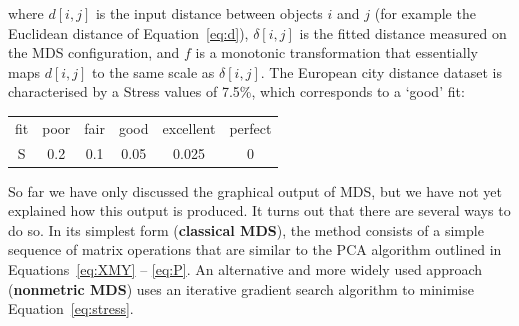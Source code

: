 \noindent where $d[i,j]$ is the input distance between objects $i$ and
$j$ (for example the Euclidean distance of Equation~\ref{eq:d}),
$\delta[i,j]$ is the fitted distance measured on the MDS
configuration, and $f$ is a monotonic transformation that essentially
maps $d[i,j]$ to the same scale as $\delta[i,j]$.  The European city
distance dataset is characterised by a Stress values of 7.5\%, which
corresponds to a `good' fit:

\begin{center}
  \begin{tabular}{c|ccccc}
    fit & poor & fair & good & excellent & perfect \\
    S & 0.2 & 0.1 & 0.05 & 0.025 & 0
  \end{tabular}
  \label{tab:S}
\end{center}

So far we have only discussed the graphical output of MDS, but we have
not yet explained how this output is produced. It turns out that there
are several ways to do so. In its simplest form (\textbf{classical
  MDS}), the method consists of a simple sequence of matrix operations
that are similar to the PCA algorithm outlined in
Equations~\ref{eq:XMY} -- \ref{eq:P}. An alternative and more widely
used approach (\textbf{nonmetric MDS}) uses an iterative gradient
search algorithm to minimise Equation~\ref{eq:stress}.\medskip

